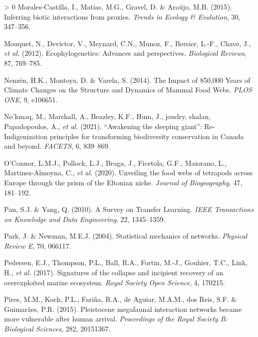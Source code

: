 \documentclass[11pt]{article}
\newlength{\cslhangindent}
\newenvironment{CSLReferences}[3] %
 {%
  \setlength{\parindent}{0pt}
  \ifodd #1 \everypar{\setlength{\hangindent}{\cslhangindent}}\ignorespaces\fi
  \ifnum #2 > 0
  \setlength{\parskip}{#2\baselineskip}
  \fi
 }%
 {}
\begin{document}
\begin{CSLReferences}{1}{0}
\leavevmode\hypertarget{ref-Morales-Castilla2015InfBio}{}%
Morales-Castilla, I., Matias, M.G., Gravel, D. \& Araújo, M.B. (2015).
Inferring biotic interactions from proxies. \emph{Trends in Ecology \&
Evolution}, 30, 347--356.

\leavevmode\hypertarget{ref-Mouquet2012EcoAdv}{}%
Mouquet, N., Devictor, V., Meynard, C.N., Munoz, F., Bersier, L.-F.,
Chave, J., \emph{et al.} (2012). Ecophylogenetics: Advances and
perspectives. \emph{Biological Reviews}, 87, 769--785.

\leavevmode\hypertarget{ref-Nenzen2014Imp850}{}%
Nenzén, H.K., Montoya, D. \& Varela, S. (2014). The Impact of 850,000
Years of Climate Changes on the Structure and Dynamics of Mammal Food
Webs. \emph{PLOS ONE}, 9, e106651.

\leavevmode\hypertarget{ref-Nokmaq2021AwaSle}{}%
No'kmaq, M., Marshall, A., Beazley, K.F., Hum, J., joudry, shalan,
Papadopoulos, A., \emph{et al.} (2021). {``Awakening the sleeping
giant''}: Re-Indigenization principles for transforming biodiversity
conservation in Canada and beyond. \emph{FACETS}, 6, 839--869.

\leavevmode\hypertarget{ref-OConnor2020UnvFoo}{}%
O'Connor, L.M.J., Pollock, L.J., Braga, J., Ficetola, G.F., Maiorano,
L., Martinez-Almoyna, C., \emph{et al.} (2020). Unveiling the food webs
of tetrapods across Europe through the prism of the Eltonian niche.
\emph{Journal of Biogeography}, 47, 181--192.

\leavevmode\hypertarget{ref-Pan2010SurTra}{}%
Pan, S.J. \& Yang, Q. (2010). A Survey on Transfer Learning. \emph{IEEE
Transactions on Knowledge and Data Engineering}, 22, 1345--1359.

\leavevmode\hypertarget{ref-Park2004StaMec}{}%
Park, J. \& Newman, M.E.J. (2004). Statistical mechanics of networks.
\emph{Physical Review E}, 70, 066117.

\leavevmode\hypertarget{ref-Pedersen2017SigCol}{}%
Pedersen, E.J., Thompson, P.L., Ball, R.A., Fortin, M.-J., Gouhier,
T.C., Link, H., \emph{et al.} (2017). Signatures of the collapse and
incipient recovery of an overexploited marine ecosystem. \emph{Royal
Society Open Science}, 4, 170215.

\leavevmode\hypertarget{ref-Pires2015PleMeg}{}%
Pires, M.M., Koch, P.L., Fariña, R.A., de Aguiar, M.A.M., dos Reis, S.F.
\& Guimarães, P.R. (2015). Pleistocene megafaunal interaction networks
became more vulnerable after human arrival. \emph{Proceedings of the
Royal Society B: Biological Sciences}, 282, 20151367.


\end{CSLReferences}
\end{document}
